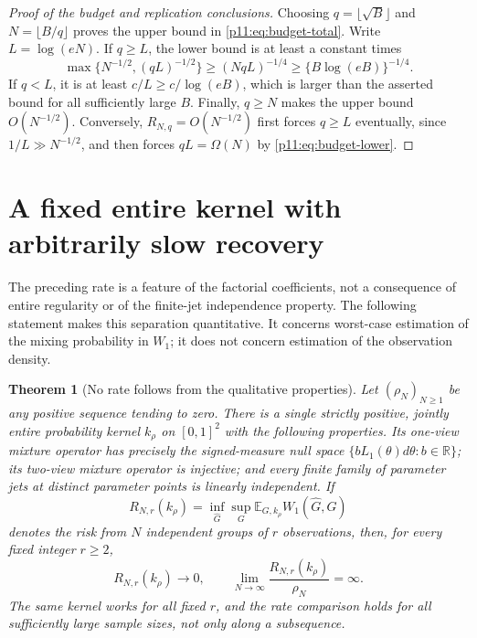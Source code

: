 \documentclass[11pt,letterpaper]{article}
\newtheorem{theorem}{Theorem}[section]
\theoremstyle{definition}
\theoremstyle{remark}
\newcommand{\1}{\mathbf 1}
\begin{document}
\begin{proof}[Proof of the budget and replication conclusions]
Choosing $q=\lfloor\sqrt B\rfloor$ and $N=\lfloor B/q\rfloor$
proves the upper bound in \eqref{p11:eq:budget-total}.
Write $L=\log(eN)$.  If $q\ge L$, the lower bound is at least a
constant times
\[
 \max\{N^{-1/2},(qL)^{-1/2}\}
 \ge(NqL)^{-1/4}\ge\{B\log(eB)\}^{-1/4}.
\]
If $q<L$, it is at least $c/L\ge c/\log(eB)$, which is larger
than the asserted bound for all sufficiently large $B$.
Finally, $q\ge N$ makes the upper bound $O(N^{-1/2})$.
Conversely, $R_{N,q}=O(N^{-1/2})$ first forces $q\ge L$
eventually, since $1/L\gg N^{-1/2}$, and then forces
$qL=\Omega(N)$ by \eqref{p11:eq:budget-lower}.
\end{proof}




\section{A fixed entire kernel with arbitrarily slow recovery}
\label{p10:sec:quant-arbitrary-slow}

The preceding rate is a feature of the factorial coefficients, not a
consequence of entire regularity or of the finite-jet independence
property.  The following statement makes this separation quantitative.
It concerns worst-case estimation of the mixing probability in $W_1$;
it does not concern estimation of the observation density.

\begin{theorem}[No rate follows from the qualitative properties]
\label{p10:thm:quant-arbitrary-slow}
Let $(\rho_N)_{N\ge1}$ be any positive sequence tending to zero.
There is a single strictly positive, jointly entire probability kernel
$k_\rho$ on $[0,1]^2$ with the following properties.  Its one-view
mixture operator has precisely the signed-measure null space
$\{bL_1(\theta)d\theta:b\in\mathbb R\}$; its two-view mixture
operator is injective; and every finite family of parameter jets at
distinct parameter points is linearly independent.  If
\[
 R_{N,r}(k_\rho)=\inf_{\widehat G}\sup_G
       \mathbb E_{G,k_\rho}W_1(\widehat G,G)
\]
denotes the risk from $N$ independent groups of $r$ observations,
then, for every fixed integer $r\ge2$,
\begin{equation}\label{p10:eq:quant-arbitrarily-slow}
 R_{N,r}(k_\rho)\longrightarrow0,
 \qquad
 \lim_{N\to\infty}\frac{R_{N,r}(k_\rho)}{\rho_N}=\infty.
\end{equation}
The same kernel works for all fixed $r$, and the rate comparison holds
for all sufficiently large sample sizes, not only along a subsequence.
\end{theorem}
\end{document}
